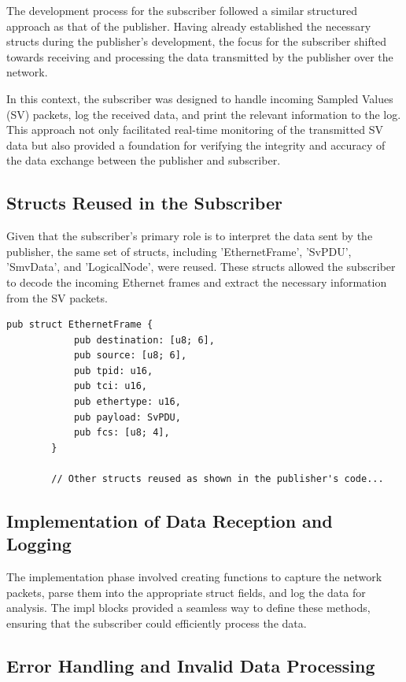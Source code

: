 	The development process for the subscriber followed a similar structured approach as that of the publisher. Having already established the necessary structs during the publisher's development, the focus for the subscriber shifted towards receiving and processing the data transmitted by the publisher over the network.
	
	In this context, the subscriber was designed to handle incoming Sampled Values (SV) packets, log the received data, and print the relevant information to the log. This approach not only facilitated real-time monitoring of the transmitted SV data but also provided a foundation for verifying the integrity and accuracy of the data exchange between the publisher and subscriber.
	
	\subsection{Structs Reused in the Subscriber}
	
	Given that the subscriber's primary role is to interpret the data sent by the publisher, the same set of structs, including 'EthernetFrame', 'SvPDU', 'SmvData', and 'LogicalNode', were reused. These structs allowed the subscriber to decode the incoming Ethernet frames and extract the necessary information from the SV packets.
	
	\begin{lstlisting}[caption={EthernetFrame struct. }]
		pub struct EthernetFrame {
			pub destination: [u8; 6],
			pub source: [u8; 6],
			pub tpid: u16,
			pub tci: u16,
			pub ethertype: u16,
			pub payload: SvPDU,
			pub fcs: [u8; 4],
		}
		
		// Other structs reused as shown in the publisher's code...
	\end{lstlisting}
	
	\subsection{Implementation of Data Reception and Logging}
	
	The implementation phase involved creating functions to capture the network packets, parse them into the appropriate struct fields, and log the data for analysis. The impl blocks provided a seamless way to define these methods, ensuring that the subscriber could efficiently process the data.
	
	\subsection{Error Handling and Invalid Data Processing}
	

